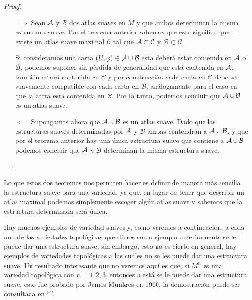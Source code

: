 \begin{proof}
	\begin{itemize}
		\item [$\implies$] Sean $\mathcal{A}$ y $\mathcal{B}$ dos atlas suaves en $M$ y que ambos determinan la misma estructura suave. Por el teorema anterior sabemos que esto significa que existe un atlas suave maximal $\mathcal{C}$ tal que $\mathcal{A} \subset \mathcal{C}$ y $\mathcal{B} \subset \mathcal{C}$.

		      Si consideramos una carta $(U,\varphi) \in \mathcal{A} \cup \mathcal{B}$ esta deberá estar contenida en $\mathcal{A}$ o $\mathcal{B}$, podemos suponer sin pérdida de generalidad que está contenida en $\mathcal{A}$, también estará contenida en $\mathcal{C}$ y por construcción cada carta en $\mathcal{C}$ debe ser suavemente compatible con cada carta en $\mathcal{B}$, análogamente para el caso en que la carta está contenida en $\mathcal{B}$. Por lo tanto, podemos concluir que $\mathcal{A} \cup \mathcal{B}$ es un atlas suave.
		\item [$\impliedby$] Supongamos ahora que $\mathcal{A} \cup \mathcal{B}$ es un atlas suave. Dado que las estructuras suaves determinadas por $\mathcal{A}$ y $\mathcal{B}$ ambas contendrán a $\mathcal{A} \cup \mathcal{B}$, y que por el teorema anterior hay una única estructura suave que contiene a $\mathcal{A} \cup \mathcal{B}$ podemos concluir que $\mathcal{A}$ y $\mathcal{B}$ determinan la misma estructura suave.
	\end{itemize}
\end{proof}

Lo que estos dos teoremas nos permiten hacer es definir de manera más sencilla la estructura suave para una variedad, ya que, en lugar de tener que describir un atlas maximal podemos simplemente escoger algún atlas suave y sabemos que la estructura determinada será única.

Hay muchos ejemplos de variedad suaves y, como veremos a continuación, a cada una de las variedades topológicas que dimos como ejemplo anteriormente se le puede dar una estructura suave, sin embargo, esto no es cierto en general, hay ejemplos de variedades topológicas a las cuales no se les puede dar una estructura suave. Un resultado interesante que no veremos aquí es que, si $M^n$ es una variedad topológica con $n=1,2,3$, entonces a está se le puede dar una estructura suave, esto fue probado por James Munkres en 1960, la demostración puede ser consultada en \enquote{\textcite{munkres1960obstructions}}.


